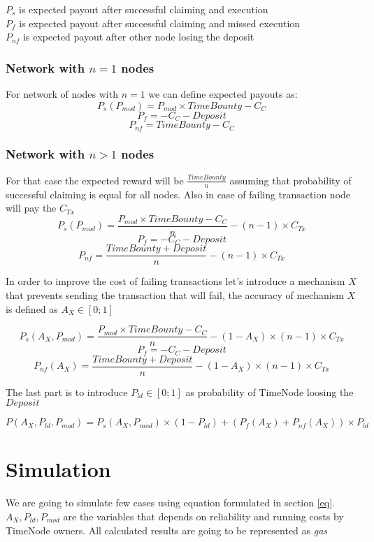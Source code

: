 \documentclass{article}
\begin{document}
  $P_{s}$ is expected payout after successful claiming and execution
  \\
  
  $P_{f}$ is expected payout after successful claiming and missed execution
  \\
  
  $P_{nf}$ is expected payout after other node losing the deposit
  \\
  
  \subsubsection{Network with $n=1$ nodes}
  For network of nodes with $n=1$ we can define expected payouts as:
  \[
  P_{s}(P_{mod})=P_{mod} \times TimeBounty-C_{C} 
  \]
  \[
  P_{f}=-C_{C}-Deposit
  \]
  \[
  P_{nf}=TimeBounty-C_{C}
  \]
  \subsubsection{Network with $n>1$ nodes}
  For that case the expected reward will be $\frac{TimeBounty}{n}$ assuming that probability of successful claiming is equal for all nodes. Also in case of failing transaction node will pay the $C_{Tx}$
  \[
  P_{s}(P_{mod})=\frac{P_{mod} \times TimeBounty-C_{C}}{n} - (n-1) \times C_{Tx}
  \]
  \[
  P_{f}=-C_{C}-Deposit
  \]
  \[
  P_{nf}=\frac{TimeBounty+Deposit}{n} - (n-1) \times C_{Tx}
  \]
  
  In order to improve the cost of failing transactions let's introduce a mechanism $X$ that prevents sending the transaction that will fail, the accuracy of mechanism $X$ is defined as $A_{X} \in [0;1]$
  
  \[
  P_{s}(A_{X}, P_{mod})=\frac{P_{mod} \times TimeBounty-C_{C}}{n} - (1-A_{X}) \times (n-1) \times C_{Tx}
  \]
  \[
  P_{f}=-C_{C}-Deposit
  \]
  \[
  P_{nf}(A_{X})=\frac{TimeBounty+Deposit}{n} - (1-A_{X}) \times (n-1) \times C_{Tx}
  \]
  
  The last part is to introduce $P_{ld} \in [0;1]$ as probability of TimeNode loosing the $Deposit$
  
  
  \[
  \label{eq}
  P(A_{X}, P_{ld}, P_{mod})=P_{s}(A_{X}, P_{mod}) \times (1-P_{ld}) + (P_{f}(A_{X})+P_{nf}(A_{X})) \times P_{ld}
  \]
  \section{Simulation}
  We are going to simulate few cases using equation formulated in section \ref{eq}. $A_{X}, P_{ld}, P_{mod}$ are the variables that depends on reliability and running costs by TimeNode owners. All calculated results are going to be represented as \textit{gas}
  
\end{document}
